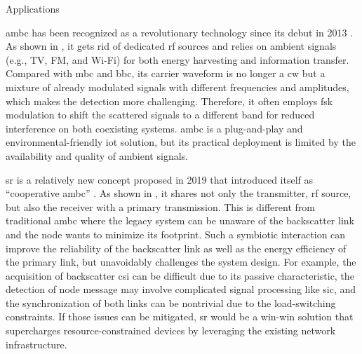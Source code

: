 \begin{section}{}
\begin{subsection}{Applications}
		\begin{subsubsection}{}
			\gls{ambc} has been recognized as a revolutionary technology since its debut in 2013 \cite{Liu2013b}.
			As shown in , it gets rid of dedicated \gls{rf} sources and relies on ambient signals (e.g., TV, FM, and Wi-Fi) for both energy harvesting and information transfer.
			Compared with \gls{mbc} and \gls{bbc}, its carrier waveform is no longer a \gls{cw} but a mixture of already modulated signals with different frequencies and amplitudes, which makes the detection more challenging.
			Therefore, it often employs \gls{fsk} modulation to shift the scattered signals to a different band for reduced interference on both coexisting systems.
			\gls{ambc} is a plug-and-play and environmental-friendly \gls{iot} solution, but its practical deployment is limited by the availability and quality of ambient signals.
		\end{subsubsection}

		\begin{subsubsection}{}
			\gls{sr} is a relatively new concept proposed in 2019 that introduced itself as ``cooperative \gls{ambc}'' \cite{Guo2019b}.
			As shown in , it shares not only the transmitter, \gls{rf} source, but also the receiver with a primary transmission.
			This is different from traditional \gls{ambc} where the legacy system can be unaware of the backscatter link and the node wants to minimize its footprint.
			Such a symbiotic interaction can improve the reliability of the backscatter link as well as the energy efficiency of the primary link, but unavoidably challenges the system design.
			For example, the acquisition of backscatter \gls{csi} can be difficult due to its passive characteristic, the detection of node message may involve complicated signal processing like \gls{sic}, and the synchronization of both links can be nontrivial due to the load-switching constraints.
			If those issues can be mitigated, \gls{sr} would be a win-win solution that supercharges resource-constrained devices by leveraging the existing network infrastructure.
		\end{subsubsection}
	\end{subsection}
\end{section}






